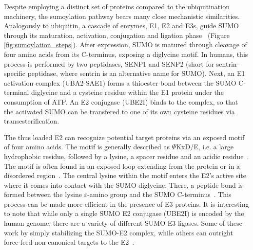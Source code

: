 Despite employing a distinct set of proteins compared to the ubiquitination machinery, the sumoylation pathway bears many close mechanistic similarities. Analogously to ubiquitin, a cascade of enzymes, E1, E2 and E3s, guide SUMO through its maturation, activation, conjugation and ligation phase~\cite{geiss-friedlander_concepts_2007} (Figure \ref{fig:sumoylation_steps}). After expression, SUMO is matured through cleavage of four amino acids from its C-terminus, exposing a diglycine motif. In humans, this process is performed by two peptidases, SENP1 and SENP2 (short for sentrin-specific peptidase, where sentrin is an alternative name for SUMO). Next, an E1 activation complex (UBA2-SAE1) forms a thioester bond between the SUMO C-terminal diglycine and a cysteine residue within the E1 protein under the consumption of ATP. An E2 conjugase (UBE2I) binds to the complex, so that the activated SUMO can be transfered to one of its own cysteine residues via transesterification. 

The thus loaded E2 can recognize potential target proteins via an exposed motif of four amino acids. The motif is generally described as $\Psi$KxD/E, i.e. a large hydrophobic residue, followed by a lysine, a spacer residue and an acidic residue~\cite{sampson_small_2001}. The motif is often found in an exposed loop extending from the protein or in a disordered region~\cite{bernier-villamor_structural_2002,macauley_beads---string_2006,geiss-friedlander_concepts_2007}. The central lysine within the motif enters the E2's active site where it comes into contact with the SUMO diglycine. There, a peptide bond is formed between the lysine $\varepsilon$-amino group and the SUMO C-terminus~\cite{bernier-villamor_structural_2002}. This process can be made more efficient in the presence of E3 proteins. It is interesting to note that while only a single SUMO E2 conjugase (UBE2I) is encoded by the human genome, there are a variety of different SUMO E3 ligases. Some of these work by simply stabilizing the SUMO-E2 complex, while others can outright force-feed non-canonical targets to the E2~\cite{streich_jr_capturing_2016}. 

